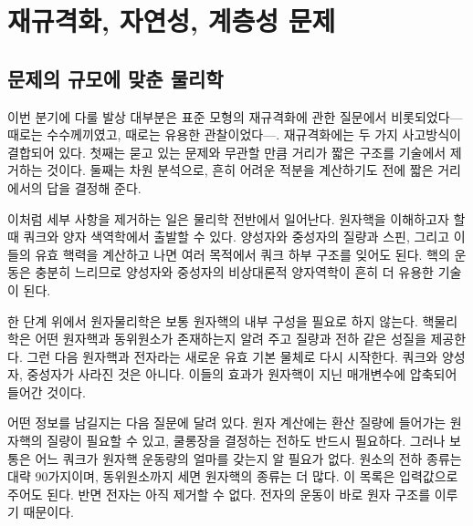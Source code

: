 \chapter{재규격화, 자연성, 계층성 문제}


\section{문제의 규모에 맞춘 물리학}

이번 분기에 다룰 발상 대부분은 표준 모형의 재규격화에 관한 질문에서 비롯되었다---때로는 수수께끼였고, 때로는 유용한 관찰이었다---. 재규격화에는 두 가지 사고방식이 결합되어 있다. 첫째는 묻고 있는 문제와 무관할 만큼 거리가 짧은 구조를 기술에서 제거하는 것이다. 둘째는 차원 분석으로, 흔히 어려운 적분을 계산하기도 전에 짧은 거리에서의 답을 결정해 준다.

이처럼 세부 사항을 제거하는 일은 물리학 전반에서 일어난다. 원자핵을 이해하고자 할 때 쿼크와 양자 색역학에서 출발할 수 있다. 양성자와 중성자의 질량과 스핀, 그리고 이들의 유효 핵력을 계산하고 나면 여러 목적에서 쿼크 하부 구조를 잊어도 된다. 핵의 운동은 충분히 느리므로 양성자와 중성자의 비상대론적 양자역학이 흔히 더 유용한 기술이 된다.

한 단계 위에서 원자물리학은 보통 원자핵의 내부 구성을 필요로 하지 않는다. 핵물리학은 어떤 원자핵과 동위원소가 존재하는지 알려 주고 질량과 전하 같은 성질을 제공한다. 그런 다음 원자핵과 전자라는 새로운 유효 기본 물체로 다시 시작한다. 쿼크와 양성자, 중성자가 사라진 것은 아니다. 이들의 효과가 원자핵이 지닌 매개변수에 압축되어 들어간 것이다.

어떤 정보를 남길지는 다음 질문에 달려 있다. 원자 계산에는 환산 질량에 들어가는 원자핵의 질량이 필요할 수 있고, 쿨롱장을 결정하는 전하도 반드시 필요하다. 그러나 보통은 어느 쿼크가 원자핵 운동량의 얼마를 갖는지 알 필요가 없다. 원소의 전하 종류는 대략 90가지이며, 동위원소까지 세면 원자핵의 종류는 더 많다. 이 목록은 입력값으로 주어도 된다. 반면 전자는 아직 제거할 수 없다. 전자의 운동이 바로 원자 구조를 이루기 때문이다.

